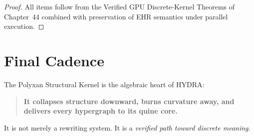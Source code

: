 \begin{proof}
All items follow from the Verified GPU Discrete-Kernel Theorems of Chapter~44 combined with preservation of EHR semantics under parallel execution.
\end{proof}

\section{Final Cadence}

The Polyxan Structural Kernel is the algebraic heart of HYDRA:

\begin{quote}
\textbf{
It collapses structure downward,
burns curvature away,
and delivers every hypergraph to its quine core.
}
\end{quote}

It is not merely a rewriting system.
It is a \emph{verified path toward discrete meaning}.

